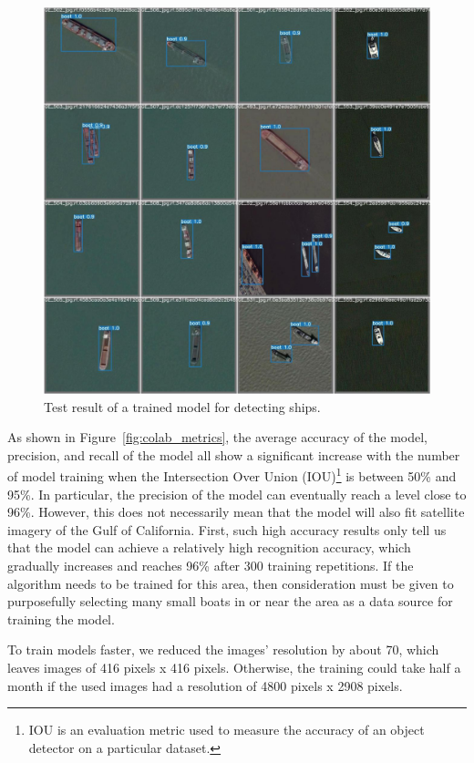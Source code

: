 \begin{figure}[t]
    \centerline{\includegraphics[width=\columnwidth]{img/test_batch1_pred.jpeg}}
    \caption{Test result of a trained model for detecting ships.}
    \label{fig:test_batch1_pred}
\end{figure}

As shown in Figure~\ref{fig:colab_metrics}, the average accuracy of the model, precision, and recall of the model all show a significant increase with the number of model training when the Intersection Over Union (IOU)\footnote{IOU is an evaluation metric used to measure the accuracy of an object detector on a particular dataset.} is between 50\% and 95\%. In particular, the precision of the model can eventually reach a level close to 96\%. However, this does not necessarily mean that the model will also fit satellite imagery of the Gulf of California. First, such high accuracy results only tell us that the model can achieve a relatively high recognition accuracy, which gradually increases and reaches 96\% after 300 training repetitions. If the algorithm needs to be trained for this area, then consideration must be given to purposefully selecting many small boats in or near the area as a data source for training the model. 

To train models faster, we reduced the images' resolution by about 70, which leaves images of 416 pixels x 416 pixels. Otherwise, the training could take half a month if the used images had a resolution of 4800 pixels x 2908 pixels.

